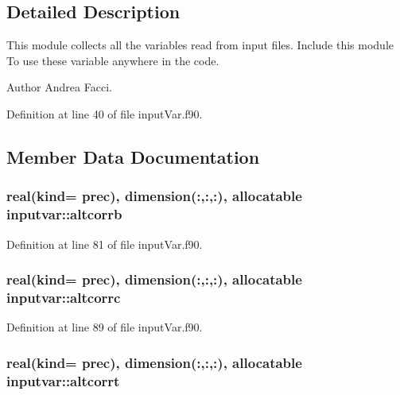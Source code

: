 \subsection{Detailed Description}
This module collects all the variables read from input files. Include this module To use these variable anywhere in the code. \begin{DoxyAuthor}{Author}
Andrea Facci. 
\end{DoxyAuthor}


Definition at line 40 of file input\-Var.\-f90.



\subsection{Member Data Documentation}
\hypertarget{classinputvar_a3fb49f59a3c5a2a19350be6bea0d69c2}{
\subsubsection[{altcorrb}]{\setlength{\rightskip}{0pt plus 5cm}real(kind= prec), dimension(\-:,\-:,\-:), allocatable inputvar\-::altcorrb}}\label{classinputvar_a3fb49f59a3c5a2a19350be6bea0d69c2}


Definition at line 81 of file input\-Var.\-f90.

\hypertarget{classinputvar_a9fe000c19d0cd93b0e53d5d6b2cbc13f}{
\subsubsection[{altcorrc}]{\setlength{\rightskip}{0pt plus 5cm}real(kind= prec), dimension(\-:,\-:,\-:), allocatable inputvar\-::altcorrc}}\label{classinputvar_a9fe000c19d0cd93b0e53d5d6b2cbc13f}


Definition at line 89 of file input\-Var.\-f90.

\hypertarget{classinputvar_a1405821026cba8a541725451f5a6f8dd}{
\subsubsection[{altcorrt}]{\setlength{\rightskip}{0pt plus 5cm}real(kind= prec), dimension(\-:,\-:,\-:), allocatable inputvar\-::altcorrt}}\label{classinputvar_a1405821026cba8a541725451f5a6f8dd}


